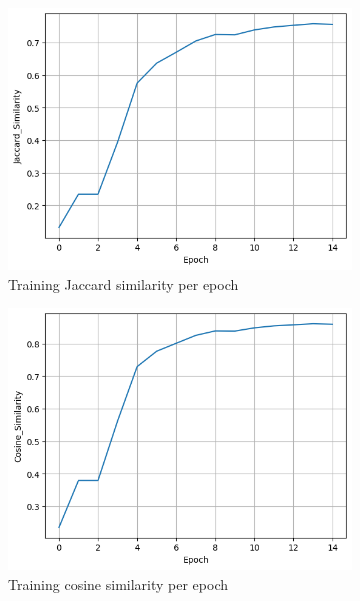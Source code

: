 \documentclass[11pt]{article}
\begin{document}
\begin{figure}[H]
\centering
\begin{subfigure}{.5\textwidth}
  \centering
  \includegraphics[width=.9\linewidth]{plots/transformer_jaccard_similarity_per_epoch}
  \caption{Training Jaccard similarity per epoch}
\end{subfigure}%
\begin{subfigure}{.5\textwidth}
  \centering
  \includegraphics[width=.9\linewidth]{plots/transformer_cosine_similarity_per_epoch}
  \caption{Training cosine similarity per epoch}
\end{subfigure}
\begin{subfigure}{.5\textwidth}
  \centering

\end{subfigure}
\end{figure}
\end{document}
